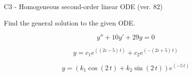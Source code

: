 \begin{exercise}
  \begin{exerciseTitle}C3 - Homogeneous second-order linear ODE (ver. 82)\end{exerciseTitle}
  \begin{exerciseStatement}
    
Find the general solution to the given ODE.

    
\[y''+10y'+29y = 0\]

  \end{exerciseStatement}
  \begin{exerciseAnswer}
    
\[y= c_{1} e^{\left(\left(2 i - 5\right) \, t\right)} + c_{2} e^{\left(-\left(2 i + 5\right) \, t\right)}\]

    
\[y= {\left(k_{1} \cos\left(2 \, t\right) + k_{2} \sin\left(2 \, t\right)\right)} e^{\left(-5 \, t\right)}\]

  \end{exerciseAnswer}
\end{exercise}